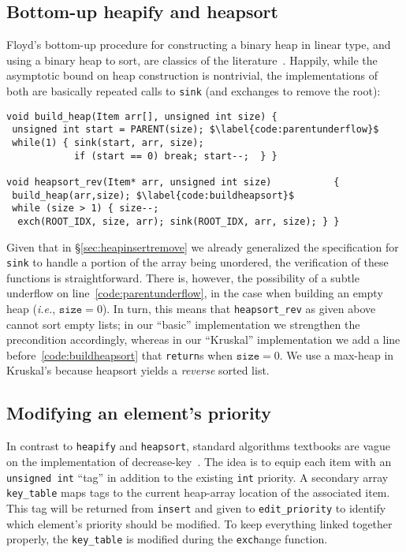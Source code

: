 \subsection{Bottom-up heapify and heapsort}

Floyd's bottom-up procedure for constructing a binary heap in linear type, and using a binary heap to sort, are classics of the literature~\cite{clrs,sedgewick}.  Happily, while the asymptotic bound on heap construction is nontrivial, the implementations of both are basically repeated calls to \texttt{sink} (and exchanges to remove the root):
\begin{lstlisting}
void build_heap(Item arr[], unsigned int size) {
 unsigned int start = PARENT(size); $\label{code:parentunderflow}$
 while(1) { sink(start, arr, size);
            if (start == 0) break; start--;  } }

void heapsort_rev(Item* arr, unsigned int size)           {
 build_heap(arr,size); $\label{code:buildheapsort}$
 while (size > 1) { size--;
  exch(ROOT_IDX, size, arr); sink(ROOT_IDX, arr, size); } }
\end{lstlisting}
Given that in \S\ref{sec:heapinsertremove} we already generalized the specification for \texttt{sink} to handle a portion of the array being unordered, the verification of these functions is straightforward.  There is, however, the possibility of a subtle underflow on line~\ref{code:parentunderflow}, in the case when building an empty heap (\emph{i.e.}, $\texttt{size}=0$).  In turn, this means that \texttt{heapsort\_rev} as given above cannot sort empty lists; in our ``basic'' implementation we strengthen the precondition accordingly, whereas in our ``Kruskal'' implementation we add a line before~\ref{code:buildheapsort} that \texttt{return}s when $\texttt{size}=0$.  We use a max-heap in Kruskal's because heapsort yields a \emph{reverse} sorted list.

\subsection{Modifying an element's priority}

In contrast to \texttt{heapify} and \texttt{heapsort}, standard algorithms textbooks are vague on the implementation of decrease-key~\cite{clrs,sedgewick}.  The idea is to equip each item with an \texttt{unsigned int} ``tag'' in addition to the existing \texttt{int} priority. A secondary array \texttt{key\_table} maps tags to the current heap-array location of the associated item.  This tag will be returned from \texttt{insert} and given to \texttt{edit\_priority} to identify which element's priority should be modified.  To keep everything linked together properly, the \texttt{key\_table} is modified during the \texttt{exch}ange function.

